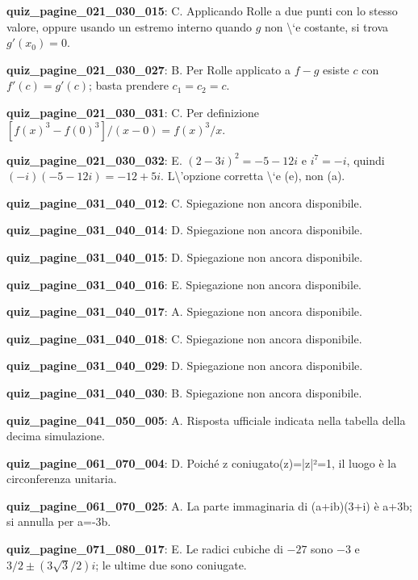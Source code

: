 \documentclass[11pt,a4paper]{article}
\newcounter{quiz}
\begin{document}
\noindent\textbf{quiz\_pagine\_021\_030\_015}: C. Applicando Rolle a due punti con lo stesso valore, oppure usando un estremo interno quando $g$ non \textbackslash{}`e costante, si trova $g\prime(x_0)=0$.\par\medskip
\noindent\textbf{quiz\_pagine\_021\_030\_027}: B. Per Rolle applicato a $f-g$ esiste $c$ con $f\prime(c)=g\prime(c)$; basta prendere $c_1=c_2=c$.\par\medskip
\noindent\textbf{quiz\_pagine\_021\_030\_031}: C. Per definizione $[f(x)^3-f(0)^3]/(x-0)=f(x)^3/x$.\par\medskip
\noindent\textbf{quiz\_pagine\_021\_030\_032}: E. $(2-3i)^2=-5-12i$ e $i^7=-i$, quindi $(-i)(-5-12i)=-12+5i$. L\textbackslash{}'opzione corretta \textbackslash{}`e (e), non (a).\par\medskip
\noindent\textbf{quiz\_pagine\_031\_040\_012}: C. Spiegazione non ancora disponibile.\par\medskip
\noindent\textbf{quiz\_pagine\_031\_040\_014}: D. Spiegazione non ancora disponibile.\par\medskip
\noindent\textbf{quiz\_pagine\_031\_040\_015}: D. Spiegazione non ancora disponibile.\par\medskip
\noindent\textbf{quiz\_pagine\_031\_040\_016}: E. Spiegazione non ancora disponibile.\par\medskip
\noindent\textbf{quiz\_pagine\_031\_040\_017}: A. Spiegazione non ancora disponibile.\par\medskip
\noindent\textbf{quiz\_pagine\_031\_040\_018}: C. Spiegazione non ancora disponibile.\par\medskip
\noindent\textbf{quiz\_pagine\_031\_040\_029}: D. Spiegazione non ancora disponibile.\par\medskip
\noindent\textbf{quiz\_pagine\_031\_040\_030}: B. Spiegazione non ancora disponibile.\par\medskip
\noindent\textbf{quiz\_pagine\_041\_050\_005}: A. Risposta ufficiale indicata nella tabella della decima simulazione.\par\medskip
\noindent\textbf{quiz\_pagine\_061\_070\_004}: D. Poiché z coniugato(z)=|z|²=1, il luogo è la circonferenza unitaria.\par\medskip
\noindent\textbf{quiz\_pagine\_061\_070\_025}: A. La parte immaginaria di (a+ib)(3+i) è a+3b; si annulla per a=-3b.\par\medskip
\noindent\textbf{quiz\_pagine\_071\_080\_017}: E. Le radici cubiche di $-27$ sono $-3$ e $3/2\pm(3\sqrt3/2)i$; le ultime due sono coniugate.\par\medskip
\end{document}
